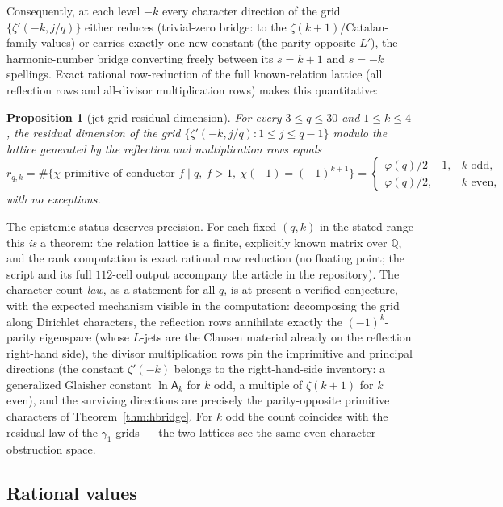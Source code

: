 \documentclass[11pt]{article}
\newtheorem{proposition}[theorem]{Proposition}
\theoremstyle{remark}
\newcommand{\Glaisher}{\mathsf{A}}
\begin{document}
Consequently, at each level $-k$ every character direction of the grid
$\{\zeta'(-k,j/q)\}$ either reduces (trivial-zero bridge: to the
$\zeta(k+1)$/Catalan-family values) or carries exactly one new constant
(the parity-opposite $L'$), the harmonic-number bridge converting freely
between its $s=k+1$ and $s=-k$ spellings. Exact rational row-reduction of
the full known-relation lattice (all reflection rows and all-divisor
multiplication rows) makes this quantitative:

\begin{proposition}[jet-grid residual dimension]\label{prop:jetrank}
For every $3\le q\le30$ and $1\le k\le4$, the residual dimension of the
grid $\{\zeta'(-k,j/q):1\le j\le q-1\}$ modulo the lattice generated by
the reflection and multiplication rows equals
\[
r_{q,k}=\#\{\chi \text{ primitive of conductor } f\mid q,\ f>1,\
\chi(-1)=(-1)^{k+1}\}
=\begin{cases}\varphi(q)/2-1,& k\text{ odd},\\
\varphi(q)/2,& k\text{ even},\end{cases}
\]
with no exceptions.
\end{proposition}

The epistemic status deserves precision. For each fixed $(q,k)$ in the
stated range this \emph{is} a theorem: the relation lattice is a finite,
explicitly known matrix over $\mathbb{Q}$, and the rank computation is
exact rational row reduction (no floating point; the script and its full
$112$-cell output accompany the article in the repository). The
character-count \emph{law}, as a statement for all $q$, is at present a
verified conjecture, with the expected mechanism visible in the
computation: decomposing the grid along Dirichlet characters, the
reflection rows annihilate exactly the $(-1)^k$-parity eigenspace (whose
$L$-jets are the Clausen material already on the reflection right-hand
side), the divisor multiplication rows pin the imprimitive and principal
directions (the constant $\zeta'(-k)$ belongs to the right-hand-side
inventory: a generalized Glaisher constant $\ln\Glaisher_k$ for $k$ odd,
a multiple of $\zeta(k+1)$ for $k$ even), and the surviving directions
are precisely the parity-opposite primitive characters of
Theorem~\ref{thm:hbridge}. For $k$ odd the count coincides with the
residual law of the $\gamma_1$-grids — the two lattices see the same
even-character obstruction space.

\subsection{Rational values}\label{sec:negvalues}
\end{document}
